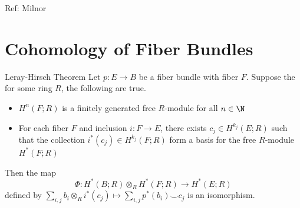\documentclass[a4paper]{article}
\begin{document}
Ref: Milnor



\pagebreak
\section{Cohomology of Fiber Bundles}

\begin{thm}{Leray-Hirsch Theorem}{} Let $p:E\to B$ be a fiber bundle with fiber $F$. Suppose the for some ring $R$, the following are true. 
\begin{itemize}
\item $H^n(F;R)$ is a finitely generated free $R$-module for all $n\in\N$
\item For each fiber $F$ and inclusion $i:F\to E$, there exists $c_j\in H^{k_j}(E;R)$ such that the collection $i^\ast(c_j)\in H^{k_j}(F;R)$ form a basis for the free $R$-module $H^\ast(F;R)$
\end{itemize}
Then the map $$\Phi:H^\ast(B;R)\otimes_R H^\ast(F;R)\to H^\ast(E;R)$$ defined by $\sum_{i,j}b_i\otimes_R i^\ast(c_j)\mapsto\sum_{i,j} p^\ast(b_i)\smile c_j$ is an isomorphism. 
\end{thm}
\end{document}
